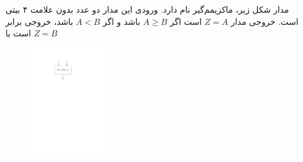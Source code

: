 
مدار شکل زیر، ماکزیمم‌گیر نام دارد. ورودی این مدار دو عدد بدون علامت
۴ بیتی است. خروجی مدار $Z=A$ است اگر $A\geq B$ باشد و اگر $A < B$ باشد، خروجی برابر است با $Z=B$


\begin{figure}[h]
	\centering
	\includegraphics[width=0.3\textwidth]{fig/Q_bonus_a.pdf}
	\label{fig:bonus_a}
\end{figure}


